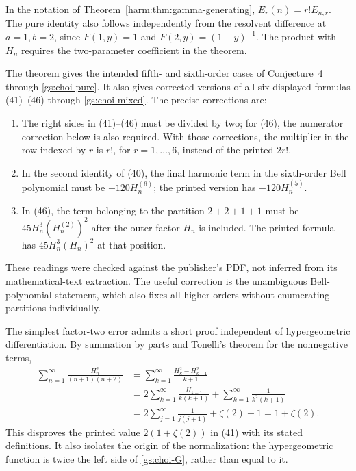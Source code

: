 In the notation of Theorem~\ref{harm:thm:gamma-generating},
$E_r(n)=r!E_{n,r}$.  The pure identity also follows independently from
the resolvent difference at $a=1,b=2$, since $F(1,y)=1$ and
$F(2,y)=(1-y)^{-1}$.  The product with $H_n$ requires the two-parameter
coefficient in the theorem.

The theorem gives the intended fifth- and sixth-order cases of
Conjecture~4 through \eqref{gs:choi-pure}.  It also gives corrected
versions of all six displayed formulas (41)--(46) through
\eqref{gs:choi-mixed}.  The precise corrections are:
\begin{enumerate}
 \item The right sides in (41)--(46) must be divided by two; for (46),
 the numerator correction below is also required.  With those
 corrections, the multiplier in the row indexed by $r$ is $r!$, for
 $r=1,\ldots,6$, instead of the printed $2r!$.
 \item In the second identity of (40), the final harmonic term in the
 sixth-order Bell polynomial must be $-120H_n^{(6)}$; the printed
 version has $-120H_n^{(5)}$.
 \item In (46), the term belonging to the partition $2+2+1+1$ must
 be $45H_n^3(H_n^{(2)})^2$ after the outer factor $H_n$ is included.
 The printed formula has $45H_n^3(H_n)^2$ at that position.
\end{enumerate}
These readings were checked against the publisher's PDF, not inferred
from its mathematical-text extraction.  The useful correction is the
unambiguous Bell-polynomial statement, which also fixes all higher
orders without enumerating partitions individually.

The simplest factor-two error admits a short proof independent of
hypergeometric differentiation.  By summation by parts and Tonelli's
theorem for the nonnegative terms,
\begin{align*}
 \sum_{n=1}^{\infty}\frac{H_n^2}{(n+1)(n+2)}
 &=\sum_{k=1}^{\infty}\frac{H_k^2-H_{k-1}^2}{k+1}\\
 &=2\sum_{k=1}^{\infty}\frac{H_{k-1}}{k(k+1)}
   +\sum_{k=1}^{\infty}\frac1{k^2(k+1)}\\
 &=2\sum_{j=1}^{\infty}\frac1{j(j+1)}+\zeta(2)-1
 =1+\zeta(2).
\end{align*}
This disproves the printed value $2(1+\zeta(2))$ in (41) with its
stated definitions.  It also isolates the origin of the normalization:
the hypergeometric function is twice the left side of
\eqref{gs:choi-G}, rather than equal to it.

